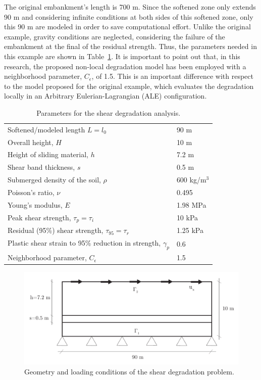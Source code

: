 \documentclass[applsci,journal,article,submit,moreauthors,pdftex]{Definitions/mdpi}
\begin{document}
The original embankment's length is 700 m. Since the softened zone only extends 90 m and considering infinite conditions at both sides of this softened zone, only this 90 m are modeled in order to save computational effort. Unlike the original example, gravity conditions are neglected, considering the failure of the embankment at the final  of the residual strength. Thus, the parameters needed in this example are shown in Table~\ref{tab2}. It is important to point out that, in this research, the proposed non-local degradation model has been employed with a neighborhood parameter, $C_{\epsilon}$, of 1.5. This is an important difference with respect to the model proposed for the original example, which evaluates the degradation locally in an Arbitrary Eulerian-Lagrangian (ALE) configuration.

\begin{table}
\caption{\label{tab2} Parameters for the shear degradation analysis.} 
\centering
	\begin{tabular}{ll}
	 Softened/modeled length $L=l_0$ & 	 90 m \\
	 Overall height, $H$ & 10 m \\
	 Height of sliding material, $h$ & 7.2 m \\
	 Shear band thickness, $s$ & 0.5 m \\
	 Submerged density of the soil, $\rho$ & 600 kg/m$^3$ \\
	 Poisson's ratio, $\nu$ & 0.495 \\
	 Young's modulus, $E$ & 1.98 MPa \\
	 Peak shear strength, $\tau_p=\tau_i$ & 10 kPa \\
	 Residual (95\%) shear strength, $\tau_{95}=\tau_r$ & 1.25 kPa \\
	 Plastic shear strain to 95\% reduction in strength, $\gamma_p$ & 0.6 \\
	 Neighborhood parameter, $C_\epsilon$ & 1.5
	\end{tabular}
\end{table}

\begin{figure}[!t]
\begin{center}
\includegraphics[width=12cm]{Figs/geo_shear.pdf}
\caption{Geometry and loading conditions of the shear degradation problem.}
\label{fig_geoshear}
\end{center}
\end{figure}
\end{document}
